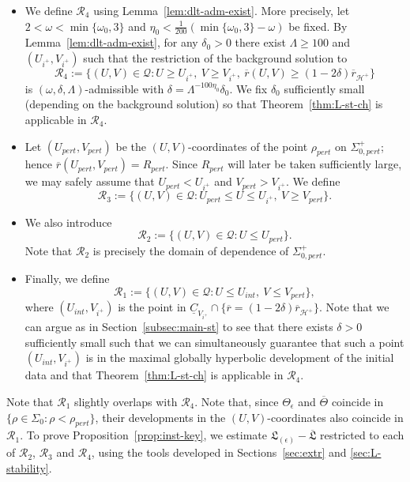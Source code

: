 \documentclass[10pt, reqno]{amsart}
\theoremstyle{definition}
\theoremstyle{remark}
\theoremstyle{conjecture}
\numberwithin{equation}{section}
\newcommand{\set}[1]{\{#1\}}
\newcommand{\0}{\emptyset}
\newcommand{\dlt}{\delta}
\newcommand{\eps}{\epsilon}
\newcommand{\Lmb}{\Lambda}
\newcommand{\Sgm}{\Sigma}
\newcommand{\Tht}{\Theta}
\newcommand{\omg}{\omega}
\newcommand{\calH}{\mathcal H}
\newcommand{\calQ}{\mathcal Q}
\newcommand{\calR}{\mathcal R}
\newcommand{\PD}{\calQ}
\newcommand{\uC}{\underline{C}}
\newcommand{\de}{\delta}
\newcommand{\EH}{\calH^{+}}
\newcommand{\rbg}{\overline{r}}					%
\begin{document}
\begin{itemize}
\item We define $\calR_{4}$ using Lemma~\ref{lem:dlt-adm-exist}. More precisely, let $2 < \omg < \min \set{\omg_{0}, 3}$ and $\eta_{0} < \frac{1}{200} (\min \set{\omg_{0}, 3} - \omg)$ be fixed. By Lemma~\ref{lem:dlt-adm-exist}, for any $\dlt_{0} > 0$ there exist $\Lmb \geq 100$ and $(U_{i^+}, V_{i^+})$ such that the restriction of the background solution to 
\begin{equation*}
\calR_{4} := \set{(U, V) \in \PD: U \geq U_{i^+}, \ V \geq V_{i^+}, \ \rbg(U, V) \geq (1 - 2 \dlt) \rbg_{\EH}}
\end{equation*}
is $(\omg, \dlt, \Lmb)$-admissible with $\dlt = \Lmb^{-100 \eta_{0}} \dlt_{0}$. We fix $\dlt_{0}$ sufficiently small (depending on the background solution) so that Theorem~\ref{thm:L-st-ch} is applicable in $\calR_{4}$.
%
\item Let $(U_{pert}, V_{pert})$ be the $(U, V)$-coordinates of the point $\rho_{pert}$ on $\Sgm_{0, pert}^{+}$; hence $\rbg(U_{pert}, V_{pert}) = R_{pert}$. Since $R_{pert}$ will later be taken sufficiently large, we may safely assume that $U_{pert} < U_{i^+}$ and $V_{pert} > V_{i^+}$. We define
\begin{equation*}
	\calR_{3} := \set{(U, V) \in \PD : U_{pert} \leq U \leq U_{i^+}, \ V \geq V_{pert}}.
\end{equation*}
\item We also introduce 
\begin{equation*}
\calR_{2} := \set{(U, V) \in \PD : U \leq U_{pert}}.
\end{equation*}
Note that $\calR_{2}$ is precisely the domain of dependence of $\Sgm_{0, pert}^{+}$.
\item Finally, we define
\begin{equation*}
\calR_{1} := \set{(U, V) \in \PD : U \leq U_{int}, \ V \leq V_{pert}},
\end{equation*}
where $(U_{int}, V_{i^{+}})$ is the point in $\uC_{V_{i^{+}}} \cap \set{\rbg =( 1 - 2 \dlt )\rbg_{\EH}}$. Note that we can argue as in Section~\ref{subsec:main-st} to see that there exists $\de>0$ sufficiently small such that we can simultaneously guarantee that such a point $(U_{int}, V_{i^{+}})$ is in the maximal globally hyperbolic development of the initial data and that Theorem~\ref{thm:L-st-ch} is applicable in $\calR_{4}$. 
\end{itemize}

Note that $\calR_{1}$ slightly overlaps with $\calR_{4}$. Note that, since $\Tht_{\eps}$ and $\overline{\Tht}$ coincide in $\set{\rho \in \Sgm_{0} : \rho < \rho_{pert}}$, their developments in the $(U, V)$-coordinates also coincide in $\calR_{1}$. To prove Proposition~\ref{prop:inst-key}, we estimate $\mathfrak{L}_{(\eps)} - \overline{\mathfrak{L}}$ restricted to each of $\calR_{2}$, $\calR_{3}$ and $\calR_{4}$, using the tools developed in Sections~\ref{sec:extr} and \ref{sec:L-stability}.
\end{document}
